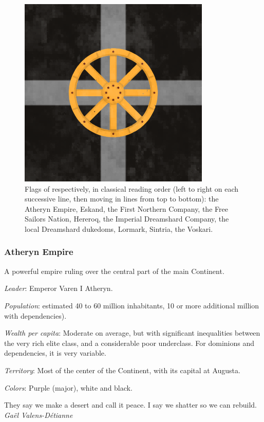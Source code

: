 \begin{figure}[!ht]
        \includegraphics[scale=0.25]{img/flag/voskari.png}

    \caption{Flags of respectively, in classical reading order (left to right on each successive line, then moving in lines from top to bottom): the Atheryn Empire, Eskand, the First Northern Company, the Free Sailors Nation, Hereroq, the Imperial Dreamshard Company, the local Dreamshard dukedoms, Lormark, Sintria, the Voskari.}
    \label{flags}
\end{figure}








\subsubsection{Atheryn Empire}


A powerful empire ruling over the central part of the main Continent.


\textit{Leader}: Emperor Varen I Atheryn.

\textit{Population}: estimated 40 to 60 million inhabitants, 10 or more additional million with dependencies).

\textit{Wealth per capita}: Moderate on average, but with significant inequalities between the very rich elite class, and a considerable poor underclass. For dominions and dependencies, it is very variable.

\textit{Territory}: Most of the center of the Continent, with its capital at Augusta.
    
\textit{Colors}: Purple (major), white and black.


\begin{rpg-quotebox}
They say we make a desert and call it peace. I say we shatter so we can rebuild. \\ \textendash \textit{Gaël Valens-Détianne}
\end{rpg-quotebox}

